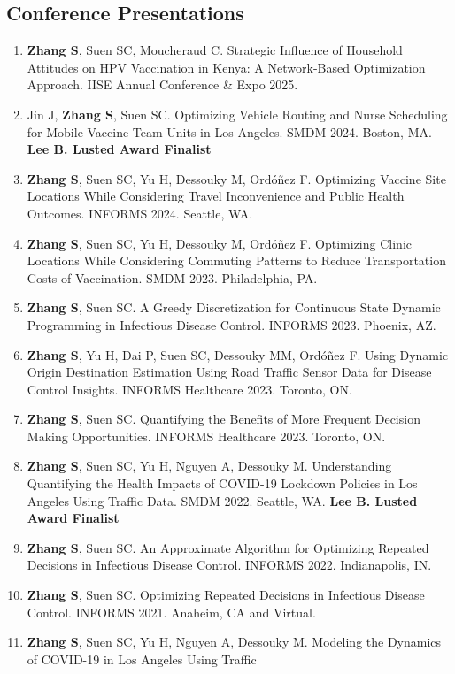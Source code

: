 \documentclass[11pt,letterpaper]{article}
\newcommand{\me}{\textbf{Zhang S}}
\begin{document}
\subsection*{Conference Presentations}
\begin{enumerate}
  \item \me, Suen SC, Moucheraud C. Strategic Influence of Household Attitudes on HPV Vaccination in Kenya:
        A Network-Based Optimization Approach. IISE Annual Conference \& Expo 2025.
  \item Jin J, \me, Suen SC. Optimizing Vehicle Routing and Nurse Scheduling for Mobile Vaccine Team Units in
        Los Angeles. SMDM 2024. Boston, MA. \textbf{Lee B. Lusted Award Finalist}
  \item \me, Suen SC, Yu H, Dessouky M, Ord\'o\~nez F. Optimizing Vaccine Site Locations While Considering Travel
        Inconvenience and Public Health Outcomes. INFORMS 2024. Seattle, WA.
  \item \me, Suen SC, Yu H, Dessouky M, Ord\'o\~nez F. Optimizing Clinic Locations While Considering Commuting
        Patterns to Reduce Transportation Costs of Vaccination. SMDM 2023. Philadelphia, PA.
  \item \me, Suen SC. A Greedy Discretization for Continuous State Dynamic Programming in Infectious Disease
        Control. INFORMS 2023. Phoenix, AZ.
  \item \me, Yu H, Dai P, Suen SC, Dessouky MM, Ord\'o\~nez F. Using Dynamic Origin Destination Estimation Using
        Road Traffic Sensor Data for Disease Control Insights. INFORMS Healthcare 2023. Toronto, ON.
  \item \me, Suen SC. Quantifying the Benefits of More Frequent Decision Making Opportunities. INFORMS
        Healthcare 2023. Toronto, ON.
  \item \me, Suen SC, Yu H, Nguyen A, Dessouky M. Understanding Quantifying the Health Impacts of COVID-19
        Lockdown Policies in Los Angeles Using Traffic Data. SMDM 2022. Seattle, WA.
        \textbf{Lee B. Lusted Award Finalist}
  \item \me, Suen SC. An Approximate Algorithm for Optimizing Repeated Decisions in Infectious Disease Control.
        INFORMS 2022. Indianapolis, IN.
  \item \me, Suen SC. Optimizing Repeated Decisions in Infectious Disease Control. INFORMS 2021. Anaheim, CA
        and Virtual.
  \item \me, Suen SC, Yu H, Nguyen A, Dessouky M. Modeling the Dynamics of COVID-19 in Los Angeles Using Traffic

\end{enumerate}
\end{document}
